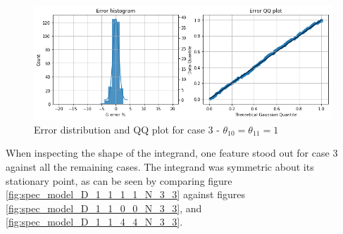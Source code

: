 \begin{figure}[!htb]
\begin{center}
    \centering
    \includegraphics[width=1.0\textwidth]{Chap6_EvaluationAndAnalysis/images/Error_model_D_1_1_1_1_N_3_3.png}
\caption{Error distribution and QQ plot for case 3 - \(\theta_{10}=\theta_{11}=1\)}
\label{fig:error_model_D_1_1_1_1_N_3_3}
\end{center}
\end{figure}

When inspecting the shape of the integrand, one feature stood out for case 3 against all the remaining cases. The integrand was symmetric about its stationary point, as can be seen by comparing figure \ref{fig:spec_model_D_1_1_1_1_N_3_3} against figures \ref{fig:spec_model_D_1_1_0_0_N_3_3}, and \ref{fig:spec_model_D_1_1_4_4_N_3_3}.

